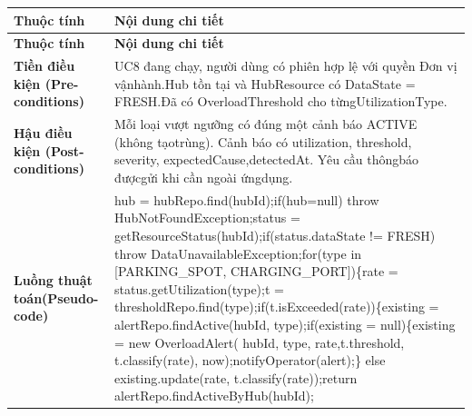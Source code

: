 \begin{longtable}{|L{0.24\textwidth}|L{0.70\textwidth}|}
\hline
\textbf{Thuộc tính} & \textbf{Nội dung chi tiết} \\
\hline
\endfirsthead
\hline
\textbf{Thuộc tính} & \textbf{Nội dung chi tiết} \\
\hline
\endhead
\textbf{Tiền điều kiện (Pre-}\newline \textbf{conditions)} & UC8 đang chạy, người dùng có phiên hợp lệ với quyền Đơn vị vận\newline hành.\newline Hub tồn tại và HubResource có DataState = FRESH.\newline Đã có OverloadThreshold cho từngUtilizationType. \\
\hline
\textbf{Hậu điều kiện (Post-}\newline \textbf{conditions)} & Mỗi loại vượt ngưỡng có đúng một cảnh báo ACTIVE (không tạo\newline trùng). Cảnh báo có utilization, threshold, severity, expectedCause,\newline detectedAt. Yêu cầu thôngbáo đượcgửi khi cần ngoài ứngdụng. \\
\hline
\textbf{Luồng thuật toán}\newline \textbf{(Pseudo-code)} & hub = hubRepo.find(hubId);\newline if(hub=null) throw HubNotFoundException;\newline status = getResourceStatus(hubId);\newline if(status.dataState != FRESH) throw DataUnavailableException;\newline for(type in [PARKING\_SPOT, CHARGING\_PORT])\{\newline rate = status.getUtilization(type);\newline t = thresholdRepo.find(type);\newline if(t.isExceeded(rate))\{\newline existing = alertRepo.findActive(hubId, type);\newline if(existing = null)\{\newline existing = new OverloadAlert( hubId, type, rate,\newline t.threshold, t.classify(rate), now);\newline notifyOperator(alert);\newline \} else existing.update(rate, t.classify(rate));\newline return alertRepo.findActiveByHub(hubId); \\
\hline
\end{longtable}
\vspace{-0.5\baselineskip}
